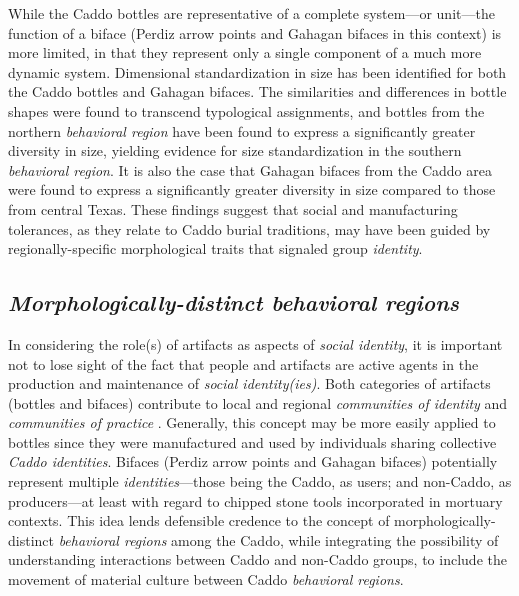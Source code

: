\documentclass[smallextended]{svjour3}       %
\begin{document}
While the Caddo bottles are representative of a complete system---or
unit---the function of a biface (Perdiz arrow points and Gahagan bifaces
in this context) is more limited, in that they represent only a single
component of a much more dynamic system. Dimensional standardization in
size has been identified for both the Caddo bottles and Gahagan bifaces.
The similarities and differences in bottle shapes were found to
transcend typological assignments, and bottles from the northern
\emph{behavioral region} have been found to express a significantly
greater diversity in size, yielding evidence for size standardization in
the southern \emph{behavioral region}. It is also the case that Gahagan
bifaces from the Caddo area were found to express a significantly
greater diversity in size compared to those from central Texas. These
findings suggest that social and manufacturing tolerances, as they
relate to Caddo burial traditions, may have been guided by
regionally-specific morphological traits that signaled group
\emph{identity}.

\hypertarget{morphologically-distinct-behavioral-regions}{%
\subsection{\texorpdfstring{\emph{Morphologically-distinct behavioral
regions}}{Morphologically-distinct behavioral regions}}\label{morphologically-distinct-behavioral-regions}}

In considering the role(s) of artifacts as aspects of \emph{social
identity}, it is important not to lose sight of the fact that people and
artifacts are active agents in the production and maintenance of
\emph{social identity(ies)}. Both categories of artifacts (bottles and
bifaces) contribute to local and regional \emph{communities of identity}
and \emph{communities of practice} \cite{RN8061}. Generally, this
concept may be more easily applied to bottles since they were
manufactured and used by individuals sharing collective \emph{Caddo
identities}. Bifaces (Perdiz arrow points and Gahagan bifaces)
potentially represent multiple \emph{identities}---those being the
Caddo, as users; and non-Caddo, as producers---at least with regard to
chipped stone tools incorporated in mortuary contexts. This idea lends
defensible credence to the concept of morphologically-distinct
\emph{behavioral regions} among the Caddo, while integrating the
possibility of understanding interactions between Caddo and non-Caddo
groups, to include the movement of material culture between Caddo
\emph{behavioral regions}.
\end{document}
